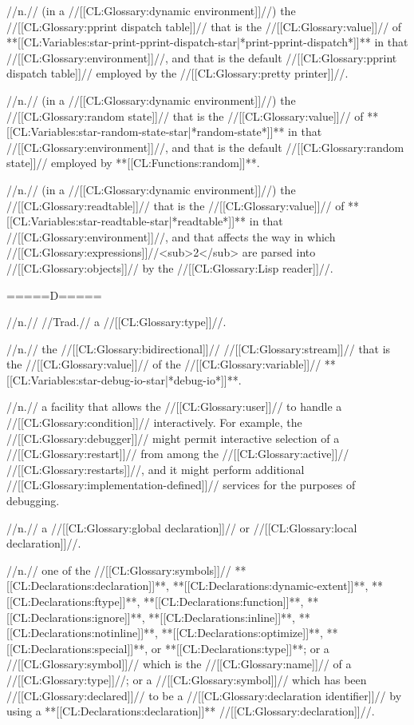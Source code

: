  //n.// (in a //[[CL:Glossary:dynamic environment]]//) the //[[CL:Glossary:pprint dispatch table]]// that is the //[[CL:Glossary:value]]// of **[[CL:Variables:star-print-pprint-dispatch-star|*print-pprint-dispatch*]]** in that //[[CL:Glossary:environment]]//, and that is the default //[[CL:Glossary:pprint dispatch table]]// employed by the //[[CL:Glossary:pretty printer]]//.

 //n.// (in a //[[CL:Glossary:dynamic environment]]//) the //[[CL:Glossary:random state]]// that is the //[[CL:Glossary:value]]// of **[[CL:Variables:star-random-state-star|*random-state*]]** in that //[[CL:Glossary:environment]]//, and that is the default //[[CL:Glossary:random state]]// employed by **[[CL:Functions:random]]**.

 //n.// (in a //[[CL:Glossary:dynamic environment]]//) the //[[CL:Glossary:readtable]]// that is the //[[CL:Glossary:value]]// of **[[CL:Variables:star-readtable-star|*readtable*]]** in that //[[CL:Glossary:environment]]//, and that affects the way in which //[[CL:Glossary:expressions]]//<sub>2</sub> are parsed into //[[CL:Glossary:objects]]// by the //[[CL:Glossary:Lisp reader]]//.

=====D=====

 //n.// //Trad.// a //[[CL:Glossary:type]]//.

 //n.// the //[[CL:Glossary:bidirectional]]// //[[CL:Glossary:stream]]// that is the //[[CL:Glossary:value]]// of the //[[CL:Glossary:variable]]// **[[CL:Variables:star-debug-io-star|*debug-io*]]**.

 //n.// a facility that allows the //[[CL:Glossary:user]]// to handle a //[[CL:Glossary:condition]]// interactively. For example, the //[[CL:Glossary:debugger]]// might permit interactive selection of a //[[CL:Glossary:restart]]// from among the //[[CL:Glossary:active]]// //[[CL:Glossary:restarts]]//, and it might perform additional //[[CL:Glossary:implementation-defined]]// services for the purposes of debugging.

 //n.// a //[[CL:Glossary:global declaration]]// or //[[CL:Glossary:local declaration]]//.

 //n.// one of the //[[CL:Glossary:symbols]]// **[[CL:Declarations:declaration]]**, **[[CL:Declarations:dynamic-extent]]**, **[[CL:Declarations:ftype]]**, **[[CL:Declarations:function]]**, **[[CL:Declarations:ignore]]**, **[[CL:Declarations:inline]]**, **[[CL:Declarations:notinline]]**, **[[CL:Declarations:optimize]]**, **[[CL:Declarations:special]]**, or **[[CL:Declarations:type]]**; or a //[[CL:Glossary:symbol]]// which is the //[[CL:Glossary:name]]// of a //[[CL:Glossary:type]]//; or a //[[CL:Glossary:symbol]]// which has been //[[CL:Glossary:declared]]// to be a //[[CL:Glossary:declaration identifier]]// by using a **[[CL:Declarations:declaration]]** //[[CL:Glossary:declaration]]//.

